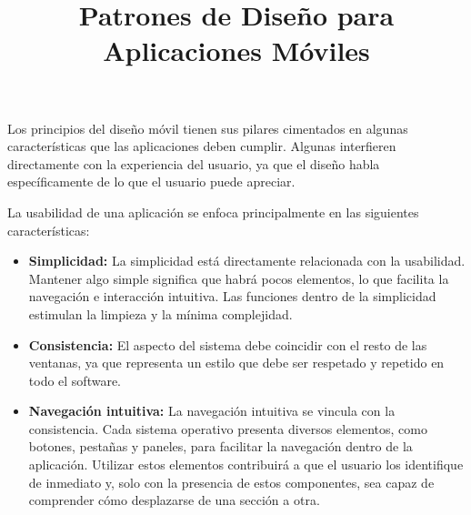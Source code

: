 \documentclass{article}
\title{Patrones de Diseño para Aplicaciones Móviles}
\author{}
\date{}
\begin{document}
\maketitle

Los principios del diseño móvil tienen sus pilares cimentados en algunas características que las aplicaciones deben cumplir. Algunas interfieren directamente con la experiencia del usuario, ya que el diseño habla específicamente de lo que el usuario puede apreciar.

La usabilidad de una aplicación se enfoca principalmente en las siguientes características:

\begin{itemize}
    \item \textbf{Simplicidad:} La simplicidad está directamente relacionada con la usabilidad. Mantener algo simple significa que habrá pocos elementos, lo que facilita la navegación e interacción intuitiva. Las funciones dentro de la simplicidad estimulan la limpieza y la mínima complejidad.
    
    \item \textbf{Consistencia:} El aspecto del sistema debe coincidir con el resto de las ventanas, ya que representa un estilo que debe ser respetado y repetido en todo el software.
    
    \item \textbf{Navegación intuitiva:} La navegación intuitiva se vincula con la consistencia. Cada sistema operativo presenta diversos elementos, como botones, pestañas y paneles, para facilitar la navegación dentro de la aplicación. Utilizar estos elementos contribuirá a que el usuario los identifique de inmediato y, solo con la presencia de estos componentes, sea capaz de comprender cómo desplazarse de una sección a otra.
\end{itemize}
\end{document}
